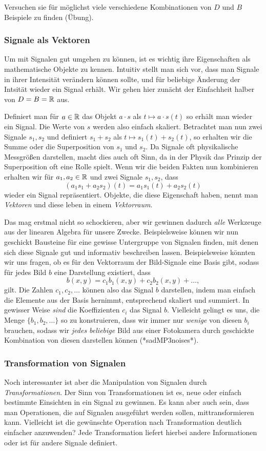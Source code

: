 Versuchen sie f\"ur m\"oglichst viele verschiedene Kombinationen von $D$ und $B$ Beispiele zu finden (\"Ubung).
%
\subsubsection{Signale als Vektoren}
%
Um mit Signalen gut umgehen zu k\"onnen, ist es wichtig ihre Eigenschaften als mathematische Objekte zu kennen.
Intuitiv stellt man sich vor, dass man Signale in ihrer Intensit\"at ver\"andern k\"onnen sollte, und f\"ur beliebige \"Anderung der Intsit\"at wieder ein Signal erh\"alt.
Wir gehen hier zun\"acht der Einfachheit halber von $D = B = \mathbb{R}$ aus.

Definiert man f\"ur $a \in \mathbb{R}$ das Objekt $a \cdot s$ als $t \mapsto a \cdot s(t)$ so erh\"alt man wieder ein Signal.
Die Werte von $s$ werden also einfach skaliert.
Betrachtet man nun zwei Signale $s_1, s_2$ und definiert $s_1 + s_2$ als $t \mapsto s_1(t) + s_2(t)$, so erhalten wir die Summe oder die Superposition von $s_1$ und $s_2$.
Da Signale oft physikalische Messgr\"o\ss{}en darstellen, macht dies auch oft Sinn, da in der Physik das Prinzip der Superposition oft eine Rolle spielt.
Wenn wir die beiden Fakten nun kombinieren erhalten wir f\"ur $a_1, a_2 \in \mathbb{R}$ und zwei Signale $s_1, s_2$, dass
\[
(a_1 s_1 + a_2 s_2)(t) = a_1 s_1(t) + a_2 s_2(t)
\]
wieder ein Signal repr\"asentiert.
Objekte, die diese Eigenschaft haben, nennt man \emph{Vektoren} und diese leben in einem \emph{Vektorraum}.

Das mag erstmal nicht so schockieren, aber wir gewinnen dadurch \emph{alle} Werkzeuge aus der linearen Algebra f\"ur unsere Zwecke.
Beispielsweise k\"onnen wir nun geschickt Bausteine f\"ur eine gewisse Untergruppe von Signalen finden, mit denen sich diese Signale gut und informativ beschreiben lassen.
Beispielsweise k\"onnten wir uns fragen, ob es f\"ur den Vektorraum der Bild-Signale eine Basis gibt, sodass f\"ur jedes Bild $b$ eine Darstellung existiert, dass
\[
b(x,y) = c_1 b_1(x,y) + c_2 b_2(x,y) + \dots,
\]
gilt. 
Die Zahlen $c_1, c_2, \dots$ k\"onnen also das Signal $b$ darstellen, indem man einfach die Elemente aus der Basis hernimmt, entsprechend skaliert und summiert.
In gewisser Weise \emph{sind} die Koeffizienten $c_i$ das Signal $b$.
Vielleicht gelingt es uns, die Menge $\{b_1, b_2, \dots\}$ so zu konstruieren, dass wir immer nur \emph{wenige} von diesen $b_i$ brauchen, sodass wir \emph{jedes beliebige} Bild aus einer Fotokamera durch geschickte Kombination von diesen darstellen k\"onnen (*sadMP3noises*). 
%
\subsubsection{Transformation von Signalen}
%
Noch interessanter ist aber die Manipulation von Signalen durch \emph{Transformationen}.
Der Sinn von Transformationen ist es, neue oder einfach bestimmte Einsichten in ein Signal zu gewinnen.
Es kann aber auch sein, dass man Operationen, die auf Signalen ausgef\"uhrt werden sollen,  mittransformieren kann.
Vielleicht ist die gew\"unschte Operation nach Transformation deutlich einfacher anzuwenden?
Jede Transformation liefert hierbei andere Informationen oder ist f\"ur andere Signale definiert.

